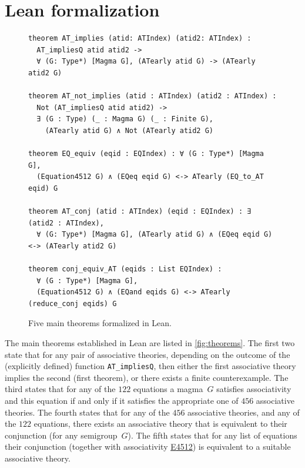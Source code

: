\documentclass[12pt]{amsart}
\theoremstyle{plain}
\theoremstyle{definition}
\newcommand{\Equaref}[1]{\href{https://teorth.github.io/equational_theories/implications/?#1}{\textrm{\textup{E}}#1}}
\begin{document}
\section{Lean formalization}
\label{sec:lean}

\begin{figure}\centering
\begin{minipage}{76ex}
\begin{lstlisting}[language=lean,linewidth=74ex,frame=single]
theorem AT_implies (atid: ATIndex) (atid2: ATIndex) :
  AT_impliesQ atid atid2 ->
  ∀ (G: Type*) [Magma G], (ATearly atid G) -> (ATearly atid2 G)

theorem AT_not_implies (atid : ATIndex) (atid2 : ATIndex) :
  Not (AT_impliesQ atid atid2) ->
  ∃ (G : Type) (_ : Magma G) (_ : Finite G),
    (ATearly atid G) ∧ Not (ATearly atid2 G)

theorem EQ_equiv (eqid : EQIndex) : ∀ (G : Type*) [Magma G],
  (Equation4512 G) ∧ (EQeq eqid G) <-> ATearly (EQ_to_AT eqid) G

theorem AT_conj (atid : ATIndex) (eqid : EQIndex) : ∃ (atid2 : ATIndex),
  ∀ (G: Type*) [Magma G], (ATearly atid G) ∧ (EQeq eqid G) <-> (ATearly atid2 G)

theorem conj_equiv_AT (eqids : List EQIndex) :
  ∀ (G : Type*) [Magma G],
  (Equation4512 G) ∧ (EQand eqids G) <-> ATearly (reduce_conj eqids) G
\end{lstlisting}
\end{minipage}
\caption{\label{fig:theorems}Five main theorems formalized in Lean.}
\end{figure}

The main theorems established in Lean are listed in \autoref{fig:theorems}.
The first two state that for any pair of associative theories, depending on the outcome of the (explicitly defined) function \texttt{AT\_impliesQ}, then either the first associative theory implies the second (first theorem), or there exists a finite counterexample.
The third states that for any of the $122$ equations a magma~$G$ satisfies associativity and this equation if and only if it satisfies the appropriate one of $456$ associative theories.
The fourth states that for any of the $456$ associative theories, and any of the $122$ equations, there exists an associative theory that is equivalent to their conjunction (for any semigroup~$G$).
The fifth states that for any list of equations their conjunction (together with associativity \Equaref{4512}) is equivalent to a suitable associative theory.
\end{document}
